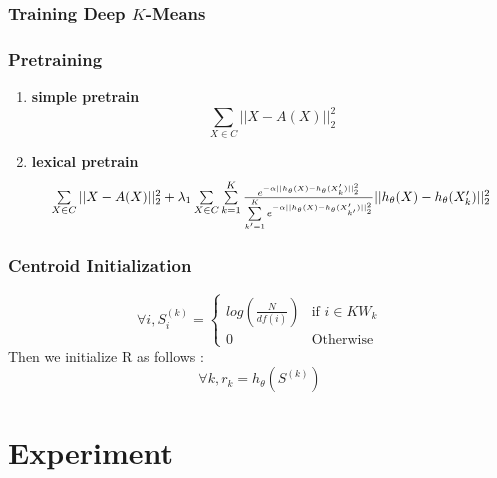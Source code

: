 \documentclass{beamer}
\begin{document}
\begin{frame}
\frametitle{Training Deep $K$-Means}
\end{frame}

\begin{frame}
  \frametitle{Pretraining}
  \begin{enumerate} 
  \item \textbf{simple pretrain} 
    $$\sum\limits_{X \in C} || X - A(X)||_2^2$$
  \item \textbf{lexical pretrain}
    $$
    \resizebox{0.91\hsize}{!}{$\sum\limits_{X \in C} || X - A(X)||_2^2 + 
      \lambda_1 \sum\limits_{X \in C} \sum\limits_{k = 1}^K \frac{e^{-\alpha|| h_\theta(X) - 
          h_\theta(X'_k)||_2^2}}{\sum\limits_{k' = 1}^K e^{-\alpha|| h_\theta(X) - 
          h_\theta(X'_{k'})||_2^2}}|| h_\theta(X) - h_\theta(X'_{k})||_2^2$}$$
  \end{enumerate}
\end{frame}

\begin{frame}
  \frametitle{Centroid Initialization}
  \begin{equation*}
    \forall i, S^{(k)}_i = \left\{
    \begin{array}{ll}
      log\left(\frac{N}{df(i)}\right) & \mbox{if } i \in KW_k \\
      0 & \mbox{Otherwise}
    \end{array}
    \right.
  \end{equation*}
  Then we initialize R as follows :
  \begin{equation*}
    \forall k, r_k =  h_\theta(S^{(k)})
  \end{equation*}
\end{frame}
\section{Experiment}
\end{document}

